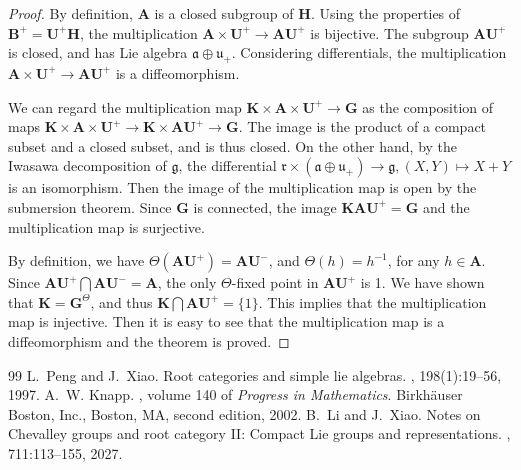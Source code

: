 \documentclass[10pt,a4paper]{amsart}
\begin{document}
\begin{proof}
    By definition, $\mathbf{A}$ is a closed subgroup of $\mathbf{H}$.
    Using the properties of $\mathbf{B}^+=\mathbf{U}^+\mathbf{H}$, the multiplication $\mathbf{A}\times \mathbf{U}^+\rightarrow \mathbf{A}\mathbf{U}^+$ is bijective.
    The subgroup $\mathbf{A}\mathbf{U}^+$ is closed, and has Lie algebra $\mathfrak{a}\oplus \mathfrak{u}_+$.
    Considering differentials, the multiplication $\mathbf{A}\times \mathbf{U}^+\rightarrow \mathbf{A}\mathbf{U}^+$ is a diffeomorphism.

    We can regard the multiplication map $\mathbf{K}\times \mathbf{A}\times \mathbf{U}^+ \rightarrow \mathbf{G}$ as the composition of maps $\mathbf{K}\times \mathbf{A}\times \mathbf{U}^+ \rightarrow \mathbf{K}\times \mathbf{A} \mathbf{U}^+ \rightarrow \mathbf{G} $.
    The image is the product of a compact subset and a closed subset, and is thus closed.
    On the other hand, by the Iwasawa decomposition of $\mathfrak{g}$, the differential $\mathfrak{r}\times (\mathfrak{a}\oplus \mathfrak{u}_+)\rightarrow \mathfrak{g},(X,Y)\mapsto X+Y$ is an isomorphism.
    Then the image of the multiplication map is open by the submersion theorem.
    Since $\mathbf{G}$ is connected, the image $\mathbf{K} \mathbf{A} \mathbf{U}^+=\mathbf{G}$ and the multiplication map is surjective.

    By definition, we have $\Theta(\mathbf{A} \mathbf{U}^+)=\mathbf{A} \mathbf{U}^-$, and $\Theta(h)=h^{-1}$, for any $h\in \mathbf{A}$.
    Since $\mathbf{A} \mathbf{U}^+ \bigcap \mathbf{A} \mathbf{U}^-=\mathbf{A}$, the only $\Theta$-fixed point in $\mathbf{A} \mathbf{U}^+$ is 1.
    We have shown that $\mathbf{K}=\mathbf{G}^{\Theta}$, and thus $\mathbf{K}\bigcap \mathbf{A} \mathbf{U}^+ =\{1\}$.
    This implies that the multiplication map is injective.
    Then it is easy to see that the multiplication map is a diffeomorphism and the theorem is proved.
\end{proof}


\begin{thebibliography}{99}
 L.~Peng and J.~Xiao. \newblock Root categories and simple lie algebras. , 198(1):19--56, 1997.
 A.~W. Knapp. , volume 140 of {\em Progress in Mathematics}. \newblock Birkh\"auser Boston, Inc., Boston, MA, second edition, 2002.
 B.~Li and J.~Xiao. \newblock Notes on {C}hevalley groups and root category {II}: Compact {L}ie groups and representations. , 711:113--155, 2027.
\end{thebibliography}
\end{document}
